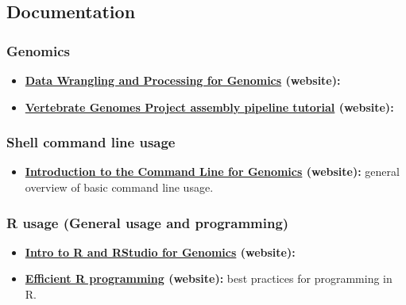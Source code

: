 \documentclass[
]{book}
\providecommand{\tightlist}{%
  \setlength{\itemsep}{0pt}\setlength{\parskip}{0pt}}
\begin{document}
\hypertarget{links-documentation}{%
\subsection*{Documentation}\label{links-documentation}}

\hypertarget{genomics}{%
\subsubsection*{Genomics}\label{genomics}}

\begin{itemize}
\tightlist
\item
  \textbf{\href{https://datacarpentry.org/wrangling-genomics/}{Data Wrangling and Processing for Genomics} (website):}
\item
  \textbf{\href{https://training.galaxyproject.org/training-material/topics/assembly/tutorials/vgp_genome_assembly/tutorial.html}{Vertebrate Genomes Project assembly pipeline tutorial} (website):}
\end{itemize}

\hypertarget{shell-command-line-usage}{%
\subsubsection*{Shell command line usage}\label{shell-command-line-usage}}

\begin{itemize}
\tightlist
\item
  \textbf{\href{https://datacarpentry.org/shell-genomics/}{Introduction to the Command Line for Genomics} (website):} general overview of basic command line usage.
\end{itemize}

\hypertarget{r-usage-general-usage-and-programming}{%
\subsubsection*{R usage (General usage and programming)}\label{r-usage-general-usage-and-programming}}

\begin{itemize}
\tightlist
\item
  \textbf{\href{https://datacarpentry.org/genomics-r-intro/}{Intro to R and RStudio for Genomics} (website):}
\item
  \textbf{\href{https://csgillespie.github.io/efficientR/index.html}{Efficient R programming} (website):} best practices for programming in R.
\end{itemize}
\end{document}
